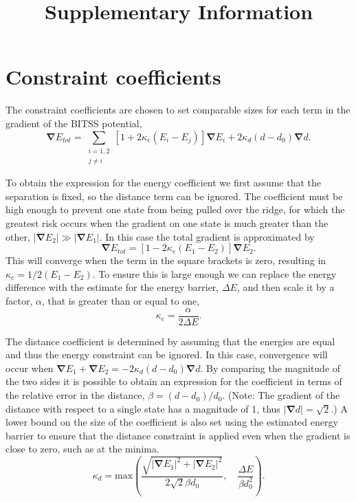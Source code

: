 \documentclass[aps,prl]{revtex4}
\newcommand{\abs}[1]{\left| #1 \right|}
\newcommand{\grad}[1]{\bm{\nabla} #1}
\begin{document}
\title{Supplementary Information}
\maketitle

\section{Constraint coefficients}
The constraint coefficients are chosen to set comparable sizes for each term in the gradient of the BITSS potential,
\begin{equation}
  \grad{E_{tot}} = \sum_{\substack{i=1,2 \\ j\neq i}} \left[ 1 + 2 \kappa_e (E_i - E_j) \right] \grad{E_i} + 2 \kappa_d (d - d_0) \grad{d}.
\end{equation}

To obtain the expression for the energy coefficient we first assume that the separation is fixed, so the distance term can be ignored.
The coefficient must be high enough to prevent one state from being pulled over the ridge, for which the greatest risk occurs when the gradient on one state is much greater than the other, $\abs{\grad{E_2}} \gg \abs{\grad{E_1}}$.
In this case the total gradient is approximated by
\begin{equation}
  \grad{E_{tot}} = \left[ 1 - 2 \kappa_e (E_1 - E_2) \right] \grad{E_2}.
\end{equation}
This will converge when the term in the square brackets is zero, resulting in $\kappa_e = 1 / 2 (E_1 - E_2)$.
To ensure this is large enough we can replace the energy difference with the estimate for the energy barrier, $\Delta E$, and then scale it by a factor, $\alpha$, that is greater than or equal to one,
\begin{equation}
  \kappa_e = \frac {\alpha} {2 \Delta E}.
\end{equation}

The distance coefficient is determined by assuming that the energies are equal and thus the energy constraint can be ignored.
In this case, convergence will occur when $\grad{E_1} + \grad{E_2} = -2 \kappa_d (d - d_0) \grad{d}$.
By comparing the magnitude of the two sides it is possible to obtain an expression for the coefficient in terms of the relative error in the distance, $\beta = (d - d_0) / d_0$.
(Note: The gradient of the distance with respect to a single state has a magnitude of 1, thus $\abs{\grad{d}} = \sqrt{2}$.)
A lower bound on the size of the coefficient is also set using the estimated energy barrier to ensure that the distance constraint is applied even when the gradient is close to zero, such as at the minima.
\begin{equation}
  \kappa_d = \mathrm{max} \! \left(
  \frac {\sqrt{\abs{\grad{E_1}}^2 + \abs{\grad{E_2}}^2}} {2 \sqrt{2} \beta d_0}, \quad
  \frac{\Delta E}{\beta d_0^2} \right).
\end{equation}
\end{document}
